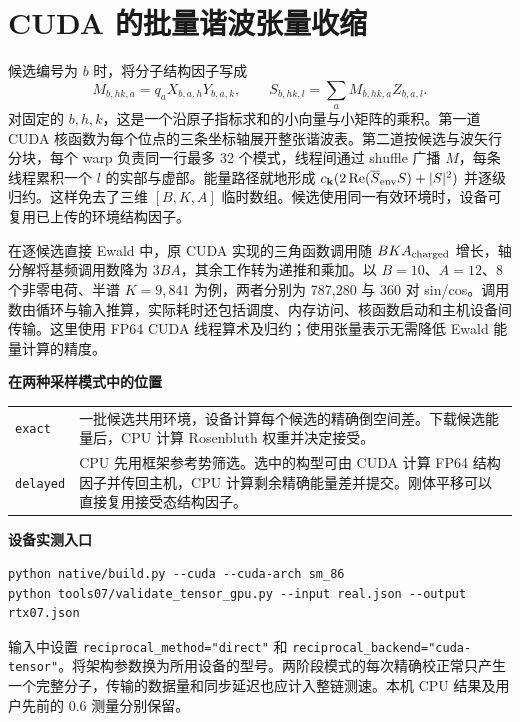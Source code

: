 \documentclass[12pt,a4paper]{article}
\newcommand{\code}[1]{\texttt{\small #1}}
\newcommand{\shead}[1]{\medskip\par\noindent\textbf{\color{navy}#1}\par}
\begin{document}
\section*{CUDA 的批量谐波张量收缩}
候选编号为 $b$ 时，将分子结构因子写成
\[
 M_{b,hk,a}=q_a X_{b,a,h}Y_{b,a,k},\qquad
 S_{b,hk,l}=\sum_a M_{b,hk,a} Z_{b,a,l}.
\]
对固定的 $b,h,k$，这是一个沿原子指标求和的小向量与小矩阵的乘积。第一道 CUDA 核函数为每个位点的三条坐标轴展开整张谐波表。第二道按候选与波矢行分块，每个 warp 负责同一行最多 32 个模式，线程间通过 shuffle 广播 $M$，每条线程累积一个 $l$ 的实部与虚部。能量路径就地形成 $c_{\mathbf k}(2\operatorname{Re}(\overline S_{\rm env}S)+|S|^2)$ 并逐级归约。这样免去了三维 $[B,K,A]$ 临时数组。候选使用同一有效环境时，设备可复用已上传的环境结构因子。
\par
在逐候选直接 Ewald 中，原 CUDA 实现的三角函数调用随 $BKA_{\rm charged}$ 增长，轴分解将基频调用数降为 $3BA$，其余工作转为递推和乘加。以 $B=10$、$A=12$、8 个非零电荷、半谱 $K=9,841$ 为例，两者分别为 787,280 与 360 对 sin/cos。调用数由循环与输入推算，实际耗时还包括调度、内存访问、核函数启动和主机设备间传输。这里使用 FP64 CUDA 线程算术及归约；使用张量表示无需降低 Ewald 能量计算的精度。
\shead{在两种采样模式中的位置}
\begin{center}\small\begin{tabularx}{\linewidth}{@{}lX@{}}\toprule
\code{exact} & 一批候选共用环境，设备计算每个候选的精确倒空间差。下载候选能量后，CPU 计算 Rosenbluth 权重并决定接受。\\
\code{delayed} & CPU 先用框架参考势筛选。选中的构型可由 CUDA 计算 FP64 结构因子并传回主机，CPU 计算剩余精确能量差并提交。刚体平移可以直接复用接受态结构因子。\\
\bottomrule\end{tabularx}\end{center}

\shead{设备实测入口}
\begin{lstlisting}
python native/build.py --cuda --cuda-arch sm_86
python tools07/validate_tensor_gpu.py --input real.json --output rtx07.json
\end{lstlisting}
输入中设置 \code{reciprocal\_method="direct"} 和 \code{reciprocal\_backend="cuda-tensor"}。将架构参数换为所用设备的型号。两阶段模式的每次精确校正常只产生一个完整分子，传输的数据量和同步延迟也应计入整链测速。本机 CPU 结果及用户先前的 0.6 测量分别保留。

\clearpage
\end{document}
